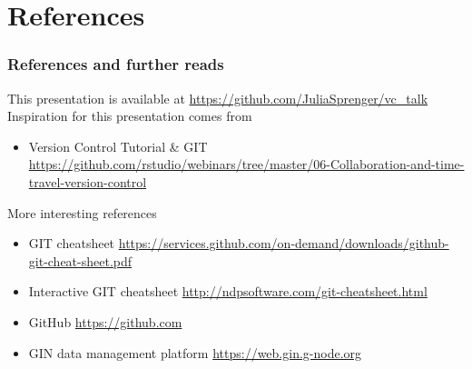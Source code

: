 \documentclass[
t, %
10pt, %
aspectratio=1610, %
ngerman,
english,
]{beamer}
\begin{document}
\section{References}
\begin{frame}
    \frametitle{References and further reads}
    This presentation is available at \url{https://github.com/JuliaSprenger/vc_talk}\\
    
    Inspiration for this presentation comes from
    \begin{itemize}
        \item Version Control Tutorial \& GIT \newline \url{https://github.com/rstudio/webinars/tree/master/06-Collaboration-and-time-travel-version-control}
    \end{itemize}
    More interesting references
    \begin{itemize}
        \item GIT cheatsheet \url{https://services.github.com/on-demand/downloads/github-git-cheat-sheet.pdf}
        \item Interactive GIT cheatsheet \url{http://ndpsoftware.com/git-cheatsheet.html}
        \item GitHub \url{https://github.com}
        \item GIN data management platform \url{https://web.gin.g-node.org}
    \end{itemize}
\end{frame}
\end{document}
